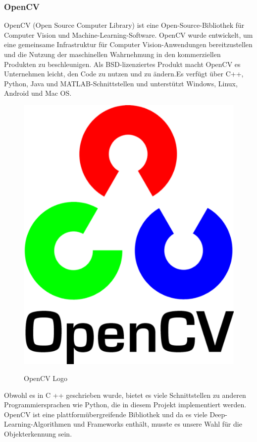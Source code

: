 \subsubsection{OpenCV}
OpenCV (Open Source Computer Library) ist eine Open-Source-Bibliothek für Computer Vision und Machine-Learning-Software. OpenCV wurde entwickelt, um eine gemeinsame Infrastruktur für Computer Vision-Anwendungen bereitzustellen und die Nutzung der maschinellen Wahrnehmung in den kommerziellen Produkten zu beschleunigen. Als BSD-lizenziertes Produkt macht OpenCV es Unternehmen leicht, den Code zu nutzen und zu ändern.Es verfügt über C++, Python, Java und MATLAB-Schnittstellen und unterstützt Windows, Linux, Android und Mac OS.\cite{OpenCV}
\begin{figure}[ht]
	\centering
	\includegraphics[scale=0.3]{./figures/opencv.png}
	\caption{ OpenCV Logo}
	\label{fig:opencv}
	\cite{OpenCVlogo}
\end{figure}
\bigbreak
Obwohl es in C ++ geschrieben wurde, bietet es viele Schnittstellen zu anderen Programmiersprachen wie Python, die in diesem Projekt implementiert werden. OpenCV ist eine plattformübergreifende Bibliothek und da es viele Deep-Learning-Algorithmen und Frameworks enthält, musste es unsere Wahl für die Objekterkennung sein.
